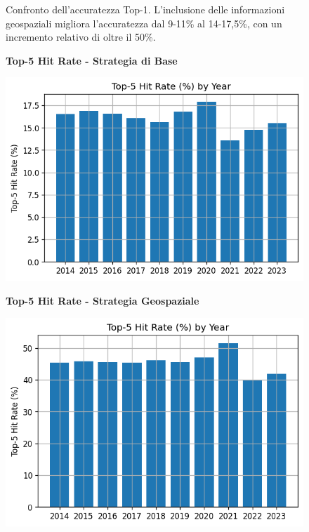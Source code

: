 \begin{itemize}
\begin{figure}[htbp]
\begin{minipage}{0.48\textwidth}
\end{minipage}
\caption{Confronto dell'accuratezza Top-1. L'inclusione delle informazioni geospaziali migliora l'accuratezza dal 9-11\% al 14-17,5\%, con un incremento relativo di oltre il 50\%.}
\label{fig:top1_comparison}
\end{figure}

\begin{figure}[htbp]
\centering
\begin{minipage}{0.48\textwidth}
\centering
\textbf{Top-5 Hit Rate - Strategia di Base}\par
\vspace{0.3em}
\includegraphics[width=\textwidth]{../../img/llama3.1_8b/no_SPACE-GEO_n-1_come_current_POI/top5_hit_rate.png}
\end{minipage}
\hfill
\begin{minipage}{0.48\textwidth}
\centering
\textbf{Top-5 Hit Rate - Strategia Geospaziale}\par
\vspace{0.3em}
\includegraphics[width=\textwidth]{../../img/llama3.1_8b/SPACE-GEO_n-1_come_current_POI/top_5_hit_rate.png}

\end{minipage}
\end{figure}
\end{itemize}
